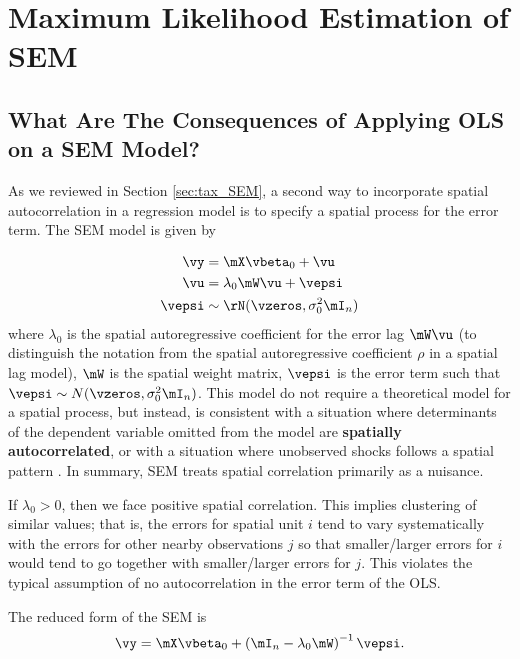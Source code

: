 \section{Maximum Likelihood Estimation of SEM}\label{sec:sem-ml}

\subsection{What Are The Consequences of Applying OLS on a SEM Model?}

As we reviewed in Section \ref{sec:tax_SEM}, a second way to incorporate spatial autocorrelation in a regression model is to specify a spatial process for the error term.  The SEM model is given by

\begin{equation}\label{eq:sem_ml}
	\begin{aligned}
	\vy  & = \mX\vbeta_0 + \vu \\ 
	 \vu & = \lambda_0 \mW \vu + \vepsi \\
	 \vepsi & \sim \rN(\vzeros, \sigma^2_0\mI_n)
	\end{aligned}
\end{equation}
%
where $\lambda_0$ is the spatial autoregressive coefficient for the error lag $\mW\vu$ (to distinguish the notation from the spatial autoregressive coefficient $\rho$ in a spatial lag model), $\mW$ is the spatial weight matrix, $\vepsi$ is the error term such that $\vepsi \sim N(\vzeros, \sigma^2_0\mI_n)$. This model do not require a theoretical model for a spatial process, but instead, is consistent with a situation where determinants of the dependent variable omitted from the model are \textbf{spatially autocorrelated}, or with a situation where unobserved shocks follows a spatial pattern \citep{elhorst2014spatial}. In summary, SEM treats spatial correlation primarily as a nuisance. 

If $\lambda_0 > 0$, then we face positive spatial correlation. This implies clustering of similar values; that is, the errors for spatial unit $i$ tend to vary systematically with the errors for other nearby observations $j$ so that smaller/larger errors for $i$ would tend to go together with smaller/larger errors for $j$. This violates the typical assumption of no autocorrelation in the error term of the OLS. 

The reduced form of the SEM is
\begin{equation*}
	\vy = \mX\vbeta_0 + \left(\mI_n-\lambda_0\mW\right)^{-1}\vepsi.
\end{equation*}

